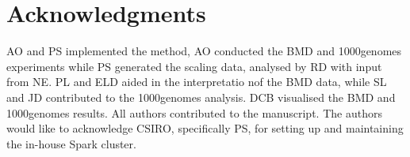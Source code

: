 \documentclass[10pt,letterpaper]{article}
\begin{document}
\section*{Acknowledgments}
AO and PS implemented the method, AO conducted the BMD and 1000genomes experiments while PS generated the scaling data,
analysed by RD with input from NE. PL and ELD aided in the interpretatio nof the BMD data, while SL and JD contributed
to the 1000genomes analysis. DCB visualised the BMD and 1000genomes results. All authors contributed to the manuscript.
The authors would like to acknowledge CSIRO, specifically PS, for setting up and maintaining the in-house Spark cluster.

\nolinenumbers


\end{document}
